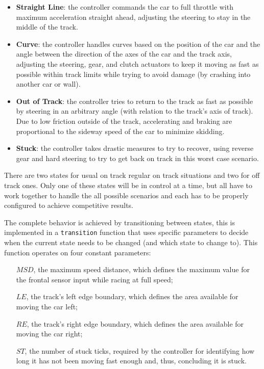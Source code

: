 \begin{itemize}
	\item \textbf{Straight Line}: the controller commands the car to full throttle 
	with maximum acceleration straight ahead, adjusting the steering to stay in 
	the middle of the track.
	
	\item \textbf{Curve}: the controller handles curves based on the position of 
	the car and the angle between the direction of the axes of the car and the 
	track axis, adjusting the steering, gear, and clutch actuators to keep it 
	moving as fast as possible within track limits while trying to avoid damage
	(by crashing into another car or wall).
	
	\item \textbf{Out of Track}: the controller tries to return to the 
	track as fast as possible by steering in an arbitrary angle (with 
	relation to the track's axis of track). Due to low friction outside of the 
	track, accelerating and braking are proportional to the sideway speed of the 
	car to minimize skidding.
	
	\item \textbf{Stuck}: the controller takes drastic measures to try to recover, 
	using reverse gear and hard steering to try to get back on track in this worst 
	case scenario.
\end{itemize}

There are two states for usual on track regular on track situations and two for
off track ones. Only one of these states will be in control at a time, but all 
have to work together to handle the all possible scenarios and each has to be
properly configured to achieve competitive results.

The complete behavior is achieved by transitioning between states, this is 
implemented in a \texttt{transition} function that uses specific parameters to decide when 
the current state needs to be changed (and which state to change to). This function 
operates on four constant parameters:
	\begin{itemize}
		\item[$MSD$,] the maximum speed distance, which defines the 
		maximum value for the frontal sensor input while racing at full speed;
		\item[$LE$,] the track's left edge boundary, which defines the area
		available for moving the car left;
		\item[$RE$,] the track's right edge boundary, which defines the area
		available for moving the car right;
		\item[$ST$,] the number of stuck ticks, required by the controller 
		for identifying how long it has not been moving fast enough and, thus,
		concluding it is stuck.
	\end{itemize}

